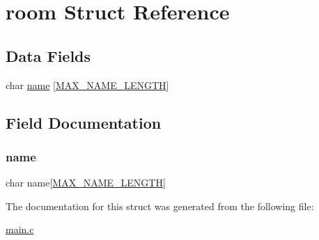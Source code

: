 \hypertarget{structroom}{}\section{room Struct Reference}
\label{structroom}
\subsection*{Data Fields}
\begin{DoxyCompactItemize}
\item 
char \hyperlink{structroom_ad50982abf9e9bbbc784f8f17fa25b1b2}{name} \mbox{[}\hyperlink{main_8c_a0c397a708cec89c74029582574516b30}{M\+A\+X\+\_\+\+N\+A\+M\+E\+\_\+\+L\+E\+N\+G\+TH}\mbox{]}
\end{DoxyCompactItemize}


\subsection{Field Documentation}
\hypertarget{structroom_ad50982abf9e9bbbc784f8f17fa25b1b2}{}\label{structroom_ad50982abf9e9bbbc784f8f17fa25b1b2} 
\subsubsection{\texorpdfstring{name}{name}}
{\footnotesize\ttfamily char name\mbox{[}\hyperlink{main_8c_a0c397a708cec89c74029582574516b30}{M\+A\+X\+\_\+\+N\+A\+M\+E\+\_\+\+L\+E\+N\+G\+TH}\mbox{]}}



The documentation for this struct was generated from the following file\+:\begin{DoxyCompactItemize}
\item 
\hyperlink{main_8c}{main.\+c}\end{DoxyCompactItemize}
